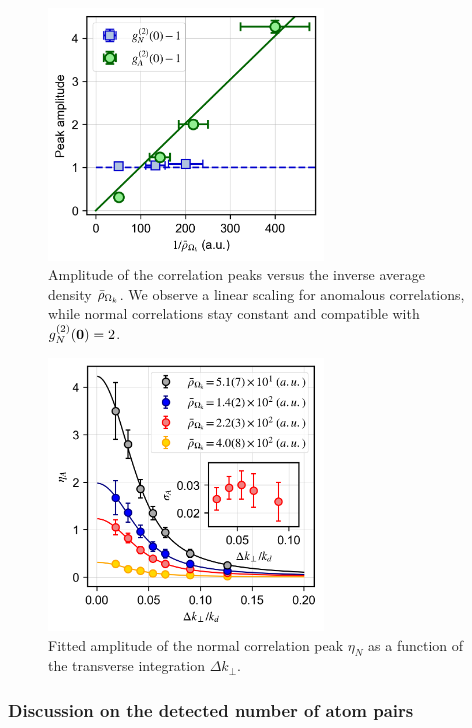 \begin{figure}
    \centering
    \includegraphics[width=0.65\textwidth]{Fig/Chapter4/amplitude_kmk.png}
    \caption{Amplitude of the correlation peaks versus the inverse average density $\bar{\rho}_{\Omega_k}$. We observe a linear scaling for anomalous correlations, while normal correlations stay constant and compatible with $g^{(2)}_N (\bm{0})=2$.}
    \label{fig:amplitude_vs_rhob}
\end{figure}

\begin{figure}
    \centering
    \includegraphics[width=0.65\textwidth]{Fig/Chapter4/eta_vs_int_kmk.png}
    \caption{Fitted amplitude of the normal correlation peak $\eta_N$ as a function of the transverse integration $\Delta k_{\perp}$.}
    \label{fig:eta_vs_int_kmk}
\end{figure}

\subsubsection{Discussion on the detected number of atom pairs}

